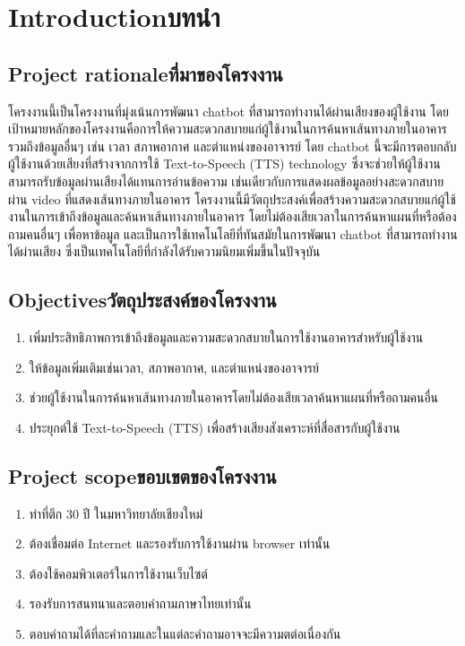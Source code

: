 \chapter{\ifenglish Introduction\else บทนำ\fi}

\section{\ifenglish Project rationale\else ที่มาของโครงงาน\fi}
โครงงานนี้เป็นโครงงานที่มุ่งเน้นการพัฒนา chatbot ที่สามารถทำงานได้ผ่านเสียงของผู้ใช้งาน
โดยเป้าหมายหลักของโครงงานคือการให้ความสะดวกสบายแก่ผู้ใช้งานในการค้นหาเส้นทางภายในอาคาร รวมถึงข้อมูลอื่นๆ
เช่น เวลา สภาพอากาศ และตำแหน่งของอาจารย์
โดย chatbot นี้จะมีการตอบกลับผู้ใช้งานด้วยเสียงที่สร้างจากการใช้ Text-to-Speech (TTS) technology
ซึ่งจะช่วยให้ผู้ใช้งานสามารถรับข้อมูลผ่านเสียงได้แทนการอ่านข้อความ เช่นเดียวกับการแสดงผลข้อมูลอย่างสะดวกสบายผ่าน
video ที่แสดงเส้นทางภายในอาคาร
โครงงานนี้มีวัตถุประสงค์เพื่อสร้างความสะดวกสบายแก่ผู้ใช้งานในการเข้าถึงข้อมูลและค้นหาเส้นทางภายในอาคาร
โดยไม่ต้องเสียเวลาในการค้นหาแผนที่หรือต้องถามคนอื่นๆ เพื่อหาข้อมูล และเป็นการใช้เทคโนโลยีที่ทันสมัยในการพัฒนา chatbot
ที่สามารถทำงานได้ผ่านเสียง ซึ่งเป็นเทคโนโลยีที่กำลังได้รับความนิยมเพิ่มขึ้นในปัจจุบัน

\section{\ifenglish Objectives\else วัตถุประสงค์ของโครงงาน\fi}
\begin{enumerate}
    \item เพิ่มประสิทธิภาพการเข้าถึงข้อมูลและความสะดวกสบายในการใช้งานอาคารสำหรับผู้ใช้งาน
    \item ให้ข้อมูลเพิ่มเติมเช่นเวลา, สภาพอากาศ, และตำแหน่งของอาจารย์
    \item ช่วยผู้ใช้งานในการค้นหาเส้นทางภายในอาคารโดยไม่ต้องเสียเวลาค้นหาแผนที่หรือถามคนอื่น
    \item ประยุกต์ใช้ Text-to-Speech (TTS) เพื่อสร้างเสียงสังเคราะห์ที่สื่อสารกับผู้ใช้งาน
\end{enumerate}

\section{\ifenglish Project scope\else ขอบเขตของโครงงาน\fi}
\begin{enumerate}
    \item ทําที่ตึก 30 ปี ในมหาวิทยาลัยเชียงใหม่
    \item ต้องเชื่อมต่อ Internet และรองรับการใช้งานผ่าน browser เท่านั้น
    \item ต้องใช้คอมพิวเตอร์ในการใช้งานเว็บไซต์
    \item รองรับการสนทนาและตอบคำถามภาษาไทยเท่านั้น
    \item ตอบคําถามได้ที่ละคําถามและในแต่ละคําถามอาจจะมีความตต่อเนื่องกัน
\end{enumerate}

